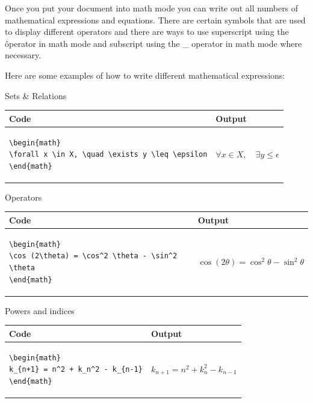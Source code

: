 \documentclass[10pt, titlepage]{article}
\begin{document}
Once you put your document into math mode you can write out all numbers of mathematical expressions and equations. There are certain symbols that are used to display different operators and there are ways to use superscript using the \^ operator in math mode and subscript using the \_ operator in math mode where necessary. 

Here are some examples of how to write different mathematical expressions:

Sets \& Relations\\
\begin{tabular}{|p{240pt}|p{240pt}|}\hline
\textbf{Code}  & \textbf{Output} \\\hline
\begin{lstlisting}
\begin{math}
\forall x \in X, \quad \exists y \leq \epsilon
\end{math}
\end{lstlisting} &
 \vspace{8pt}
\begin{math}
\forall x \in X, \quad \exists y \leq \epsilon
\end{math} \\ \hline
\end{tabular}

Operators\\
\begin{tabular}{|p{240pt}|p{240pt}|}\hline
\textbf{Code}  & \textbf{Output} \\\hline
\begin{lstlisting}
\begin{math}
\cos (2\theta) = \cos^2 \theta - \sin^2 \theta
\end{math}
\end{lstlisting} &
 \vspace{8pt}
\begin{math}
\cos (2\theta) = \cos^2 \theta - \sin^2 \theta
\end{math}\\\hline
\end{tabular}

Powers and indices\\
\begin{tabular}{|p{240pt}|p{240pt}|}\hline
\textbf{Code}  & \textbf{Output} \\\hline
\begin{lstlisting}
\begin{math}
k_{n+1} = n^2 + k_n^2 - k_{n-1}
\end{math}
\end{lstlisting} &
 \vspace{8pt}
\begin{math}
k_{n+1} = n^2 + k_n^2 - k_{n-1}
\end{math}\\\hline
\end{tabular}
\end{document}
